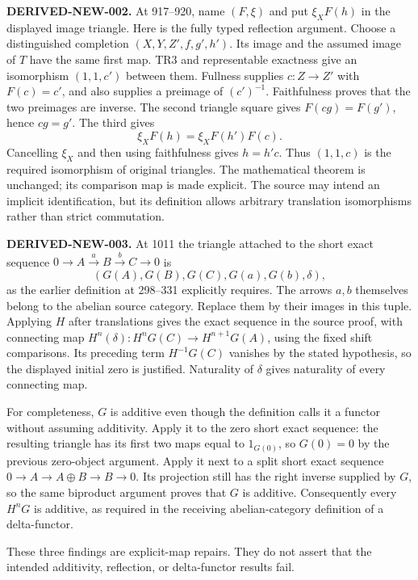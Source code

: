\documentclass[11pt]{article}
\begin{document}
\textbf{DERIVED-NEW-002.} At 917–\allowbreak{}920,\allowbreak{} name \((F,\xi)\) and put \(\xi_XF(h)\) in the displayed image triangle. Here is the fully typed reflection argument. Choose a distinguished completion \((X,Y,Z',f,g',h')\). Its image and the assumed image of \(T\) have the same first map. TR3 and representable exactness give an isomorphism \((1,1,c')\) between them. Fullness supplies \(c:Z\to Z'\) with \(F(c)=c'\),\allowbreak{} and also supplies a preimage of \((c')^{-1}\). Faithfulness proves that the two preimages are inverse. The second triangle square gives \(F(cg)=F(g')\),\allowbreak{} hence \(cg=g'\). The third gives \[
\xi_XF(h)=\xi_XF(h')F(c).
\] Cancelling \(\xi_X\) and then using faithfulness gives \(h=h'c\). Thus \((1,1,c)\) is the required isomorphism of original triangles. The mathematical theorem is unchanged; its comparison map is made explicit. The source may intend an implicit identification,\allowbreak{} but its definition allows arbitrary translation isomorphisms rather than strict commutation.

\textbf{DERIVED-NEW-003.} At 1011 the triangle attached to the short exact sequence \(0\to A\xrightarrow{a}B\xrightarrow{b}C\to0\) is \[
(G(A),G(B),G(C),G(a),G(b),\delta),
\] as the earlier definition at 298–\allowbreak{}331 explicitly requires. The arrows \(a,b\) themselves belong to the abelian source category. Replace them by their images in this tuple. Applying \(H\) after translations gives the exact sequence in the source proof,\allowbreak{} with connecting map \(H^n(\delta):H^nG(C)\to H^{n+1}G(A)\),\allowbreak{} using the fixed shift comparisons. Its preceding term \(H^{-1}G(C)\) vanishes by the stated hypothesis,\allowbreak{} so the displayed initial zero is justified. Naturality of \(\delta\) gives naturality of every connecting map.

For completeness,\allowbreak{} \(G\) is additive even though the definition calls it a functor without assuming additivity. Apply it to the zero short exact sequence:\allowbreak{} the resulting triangle has its first two maps equal to \(1_{G(0)}\),\allowbreak{} so \(G(0)=0\) by the previous zero-object argument. Apply it next to a split short exact sequence \(0\to A\to A\oplus B\to B\to0\). Its projection still has the right inverse supplied by \(G\),\allowbreak{} so the same biproduct argument proves that \(G\) is additive. Consequently every \(H^nG\) is additive,\allowbreak{} as required in the receiving abelian-category definition of a delta-functor.

These three findings are explicit-map repairs. They do not assert that the intended additivity,\allowbreak{} reflection,\allowbreak{} or delta-functor results fail.
\end{document}
